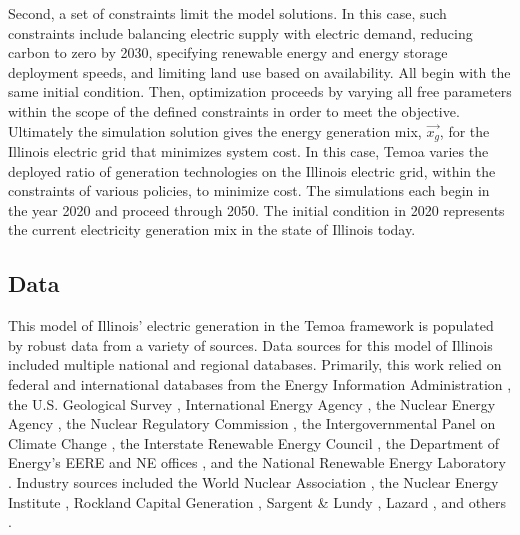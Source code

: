 Second, a set of constraints limit the model solutions. In this case, such 
constraints include balancing electric supply with electric demand, reducing 
carbon to zero by 2030, specifying renewable energy and energy
storage deployment speeds, and limiting land use based on availability.
All begin with the same initial condition. 
Then, optimization 
proceeds by varying all free parameters within the scope of the defined 
constraints in order to meet the objective. Ultimately the simulation solution 
gives the energy generation mix, $\vec{x_g}$, for the Illinois electric grid that minimizes system cost. 
In this case, Temoa varies the 
deployed ratio of generation technologies on the Illinois electric grid, within 
the constraints of various policies, to minimize cost. The simulations each 
begin in the year 2020 and proceed through 2050. The initial condition in 2020 
represents the current electricity generation mix in the state of Illinois 
today.

\FloatBarrier
\subsection{Data}

This model of Illinois' electric generation in the 
Temoa framework
is populated by robust data from a variety of sources.
Data sources for this model of Illinois included multiple national and regional 
databases. Primarily, this work relied on federal and international databases from the 
Energy Information Administration 
\cite{us_energy_information_administration_eia_preliminary_2021,energy_information_administration_state_2020,us_energy_information_administration_eia_electric_2021,us_energy_information_administration_eia_illinois_2020}, 
the U.S. Geological Survey \cite{hoen_united_2018}, 
International Energy Agency \cite{lorenczik_projected_2020}, 
the Nuclear Energy Agency \cite{crozat_full_2018}, 
the Nuclear Regulatory Commission 
\cite{united_states_nuclear_regulatory_commission_illinois_2020}, 
the Intergovernmental Panel on Climate Change 
\cite{intergovernmental_panel_on_climate_change_annex_2014,intergovernmental_panel_on_climate_change_climate_2014,intergovernmental_panel_on_climate_change_climate_2014-1,intergovernmental_panel_on_climate_change_climate_2014-2},
the Interstate Renewable Energy Council 
\cite{sherwood_us_2009,sherwood_us_2010,sherwood_us_2011,brown_solid_1996,sherwood_us_2012,sherwood_us_2013,sherwood_us_2014}, 
the Department of Energy's EERE and NE offices 
\cite{us_department_of_energy_capital_2016}, and the National Renewable Energy 
Laboratory 
\cite{nrel_national_renewable_energy_laboratory_2020_2020,sengupta_national_2018}.
Industry sources included the World Nuclear Association
\cite{world_nuclear_association_nuclear_2017}
, 
the Nuclear Energy Institute 
\cite{desai_nuclear_2018,desai_nuclear_2020,murphy_impacts_2019,tessum_air_2019},
Rockland Capital Generation \cite{rockland_capital_natural_2021},
Sargent \& Lundy \cite{sargent__lundy_capital_2020}, 
Lazard \cite{ray_lazards_2020},
and others 
\cite{the_solar_foundation_national_2020,solar_energy_industries_association_illinois_2020,rutovitz_calculating_2015}.



